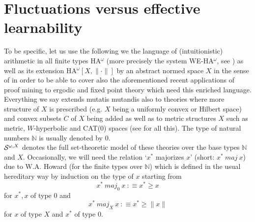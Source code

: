 \documentclass[1p]{elsarticle}
\newcommand{\NN}{\ensuremath{\mathbb{N}}}
\theoremstyle{plain}
\theoremstyle{definition}
\theoremstyle{remark}
\renewcommand{\epsilon}{\varepsilon}
\theoremstyle{definition}
\begin{document}
\section{Fluctuations versus effective learnability}
To be specific, let us use the following we the language of (intuitionistic) 
arithmetic in all finite types HA$^{\omega}$ (more precisely the system 
WE-HA$^{\omega}$, see \cite{Kohlenbach(book)}) as well as its extension HA$^{\omega}[X,\|\cdot\|]$ 
by an abstract normed space $X$ in the sense of \cite{Kohlenbach(metapaper),GerKoh06,Kohlenbach(book)} in order to be able to cover also the aforementioned 
recent applications of proof mining to ergodic and fixed point theory which 
need this enriched language. Everything we say extends mutatis mutandis also 
to theories where more structure of $X$ is prescribed (e.g. $X$ being 
a uniformly convex or Hilbert space) and convex subsets $C$ of $X$ being 
added as well as to metric structures $X$ 
such as metric, $W$-hyperbolic and CAT(0) spaces (see \cite{Kohlenbach(book)} 
for all this). The type of natural numbers $\NN$ is usually denoted by $0.$
\\[1mm] ${\cal S}^{\omega,X}$ denotes the full set-theoretic model of these 
theories over the base types $\NN$ and $X.$ Occasionally, we will need 
the relation `$x^*$ majorizes $x$' (short: $x^* \ maj \ x$) due to W.A. Howard 
(for the finite types over $\NN$)  
which is defined in the usual hereditary 
way by induction on the type of $x$ starting from 
\[ x^* \ maj_0 \ x\ :\equiv x^*\ge x \] for $x^*,x$ of type $0$ and 
\[ x^* \ maj_X \ x\ :\equiv x^* \ge \| x\|\] for $x$ of type $X$ and 
$x^*$ of type $0.$ 

\end{document}
